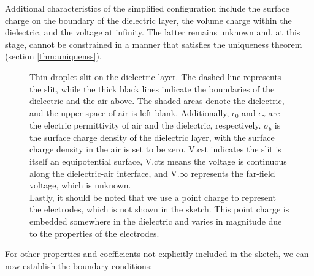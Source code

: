 Additional characteristics of the simplified configuration include the surface charge on the boundary of the dielectric layer, the volume charge within the dielectric, and the voltage at infinity. The latter remains unknown and, at this stage, cannot be constrained in a manner that satisfies the uniqueness theorem (section \ref{thm:uniquenss}).

    \begin{figure}[H]
        \centering
        \caption{\small Thin droplet slit on the dielectric layer. The dashed line represents the slit, while the thick black lines indicate the boundaries of the dielectric and the air above. The shaded areas denote the dielectric, and the upper space of air is left blank. Additionally, $\epsilon_0$ and $\epsilon_{\gamma}$ are the electric permittivity of air and the dielectric, respectively. $\sigma_b$ is the surface charge density of the dielectric layer, with the surface charge density in the air is set to be zero. V.cst indicates the slit is itself an equipotential surface, V.cts means the voltage is continuous along the dielectric-air interface, and V.$\infty$ represents the far-field voltage, which is unknown.\\
        Lastly, it should be noted that we use a point charge to represent the electrodes, which is not shown in the sketch. This point charge is embedded somewhere in the dielectric and varies in magnitude due to the properties of the electrodes.}
        \label{fig:slit}
    \end{figure}
For other properties and coefficients not explicitly included in the sketch, we can now establish the boundary conditions:

